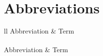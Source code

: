 \documentclass[12pt,openany]{book}
\author{}
\date{\vspace{-2.5em}}
\begin{document}
{
\setcounter{tocdepth}{4}
\tableofcontents
}
\cleardoublepage
{} \pagestyle{fancy} \fancyhf{}
\renewcommand{\headrulewidth}{0pt} \fancyfoot[LE,RO]{\thepage}
\renewcommand{\floatpagefraction}{.9} \setcounter{page}{11}

\chapter*{Abbreviations}\label{abbreviations}

\begin{longtable}{ll}
\toprule
Abbreviation & Term\\
\midrule
\endfirsthead
{}\\
\toprule
Abbreviation & Term\\
\midrule
\endhead


\end{longtable}
\end{document}
